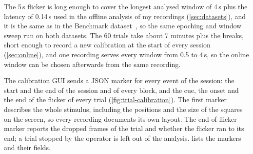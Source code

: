 The 5\,s flicker is long enough to cover the longest analysed window of 4\,s plus the
latency of 0.14\,s used in the offline analysis of my recordings (\cref{sec:datasets}),
and it is the same as in the
Benchmark dataset~\citep{wang2017benchmark}, so the same epoching and window sweep run
on both datasets.
The 60 trials take about 7 minutes plus the breaks, short enough to record a new
calibration at the start of every session (\cref{sec:online}), and one recording serves
every window from 0.5 to 4\,s, so the online window can be chosen afterwards from the
same recording.

The calibration \ac{GUI} sends a \ac{JSON} marker for every event of the session: the
start and the end of the session and of every block, and the cue, the onset and the end
of the flicker of every trial (\cref{fig:trial-calibration}). The first marker
describes the whole stimulus, including the positions and the size of the squares on
the screen, so every recording documents its own layout. The end-of-flicker marker
reports the dropped frames of the trial and whether the flicker ran to its end; a trial
stopped by the operator is left out of the analysis.  lists the
markers and their fields.


